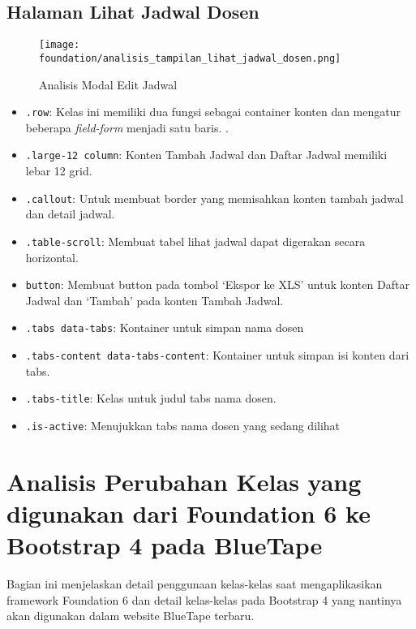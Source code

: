 \subsection{Halaman Lihat Jadwal Dosen}

\begin{figure} [H]
\centering  
\texttt{[image: foundation/analisis\_tampilan\_lihat\_jadwal\_dosen.png]}
\caption{Analisis Modal Edit Jadwal}
\end{figure}

\begin{itemize}
	\item \texttt{.row}: Kelas ini memiliki dua fungsi sebagai container konten dan mengatur beberapa \textit{field-form} menjadi satu baris. .
	\item \texttt{.large-12 column}: Konten Tambah Jadwal dan Daftar Jadwal memiliki lebar 12 grid.
	\item \texttt{.callout}: Untuk membuat border yang memisahkan konten tambah jadwal dan detail jadwal.
	\item \texttt{.table-scroll}: Membuat tabel lihat jadwal dapat digerakan secara horizontal.
	\item \texttt{button}: Membuat button pada tombol `Ekspor ke XLS' untuk konten Daftar Jadwal dan `Tambah' pada konten Tambah Jadwal.	
	\item \texttt{.tabs data-tabs}: Kontainer untuk simpan nama dosen
	\item \texttt{.tabs-content data-tabs-content}: Kontainer untuk simpan isi konten dari tabs.
	\item \texttt{.tabs-title}: Kelas untuk judul tabs nama dosen.
	\item \texttt{.is-active}: Menujukkan tabs nama dosen yang sedang dilihat
\end{itemize}

\section{Analisis Perubahan Kelas yang digunakan dari Foundation 6 ke Bootstrap 4 pada BlueTape}
Bagian ini menjelaskan detail penggunaan kelas-kelas saat mengaplikasikan framework Foundation 6 dan detail kelas-kelas pada Bootstrap 4 yang nantinya akan digunakan dalam website BlueTape terbaru.

